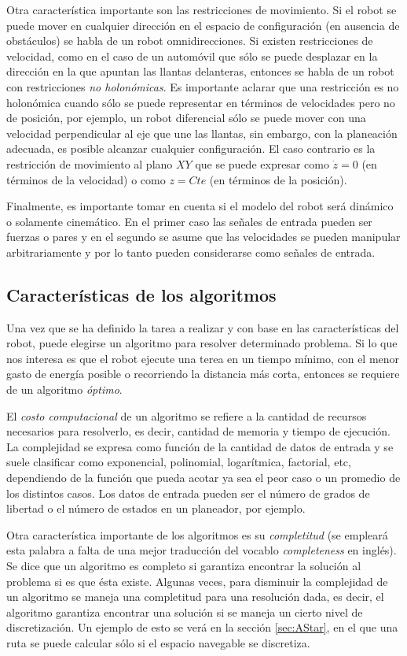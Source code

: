 \documentclass[a4paper]{article}
\begin{document}
Otra característica importante son las restricciones de movimiento. Si el robot se puede mover en cualquier dirección en el espacio de configuración (en ausencia de obstáculos) se habla de un robot omnidirecciones. Si existen restricciones de velocidad, como en el caso de un automóvil que sólo se puede desplazar en la dirección en la que apuntan las llantas delanteras, entonces se habla de un robot con restricciones \textit{no holonómicas}. Es importante aclarar que una restricción es no holonómica cuando sólo se puede representar en términos de velocidades pero no de posición, por ejemplo, un robot diferencial sólo se puede mover con una velocidad perpendicular al eje que une las llantas, sin embargo, con la planeación adecuada, es posible alcanzar cualquier configuración. El caso contrario es la restricción de movimiento al plano $XY$ que se puede expresar como $\dot{z}=0$ (en términos de la velocidad) o como $z=Cte$ (en términos de la posición).

Finalmente, es importante tomar en cuenta si el modelo del robot será dinámico o solamente cinemático. En el primer caso las señales de entrada pueden ser fuerzas o pares y en el segundo se asume que las velocidades se pueden manipular arbitrariamente y por lo tanto pueden considerarse como señales de entrada. 

\subsection{Características de los algoritmos}

Una vez que se ha definido la tarea a realizar y con base en las características del robot, puede elegirse un algoritmo para resolver determinado problema. Si lo que nos interesa es que el robot ejecute una terea en un tiempo mínimo, con el menor gasto de energía posible o recorriendo la distancia más corta, entonces se requiere de un algoritmo \textit{óptimo}. 

El \textit{costo computacional} de un algoritmo se refiere a la cantidad de recursos necesarios para resolverlo, es decir, cantidad de memoria y tiempo de ejecución. La complejidad se expresa como función de la cantidad de datos de entrada y se suele clasificar como exponencial, polinomial, logarítmica, factorial, etc, dependiendo de la función que pueda acotar ya sea el peor caso o un promedio de los distintos casos. Los datos de entrada pueden ser el número de grados de libertad o el número de estados en un planeador, por ejemplo. 

Otra característica importante de los algoritmos es su \textit{completitud} (se empleará esta palabra a falta de una mejor traducción del vocablo \textit{completeness} en inglés). Se dice que un algoritmo es completo si garantiza encontrar la solución al problema si es que ésta existe. Algunas veces, para disminuir la complejidad de un algoritmo se maneja una completitud para una resolución dada, es decir, el algoritmo garantiza encontrar una solución si se maneja un cierto nivel de discretización. Un ejemplo de esto se verá en la sección \ref{sec:AStar}, en el que una ruta se puede calcular sólo si el espacio navegable se discretiza. 
\end{document}
